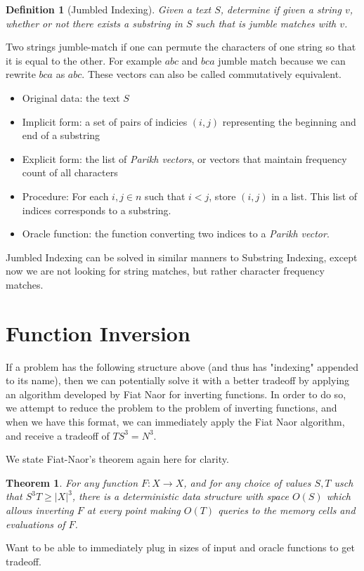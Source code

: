 \documentclass{article}
\newtheorem{definition}{Definition}
\newtheorem{theorem}{Theorem}
\begin{document}
\begin{definition}[Jumbled Indexing]
Given a text $S$, determine if given a string $v$, whether or not there exists a substring in $S$ such that is jumble matches with $v$.
\end{definition}
Two strings jumble-match if one can permute the characters of one string so that it is equal to the other. For example $abc$ and $bca$ jumble match because we can rewrite $bca$ as $abc$. These vectors can also be called commutatively equivalent.
\begin{itemize}
    \item Original data: the text $S$
    \item Implicit form: a set of pairs of indicies $(i,j)$ representing the beginning and end of a substring
    \item Explicit form: the list of \textit{Parikh vectors}, or vectors that maintain frequency count of all characters
    \item Procedure: For each $i,j \in n$ such that $i<j$, store $(i,j)$ in a list. This list of indices corresponds to a substring.
    \item Oracle function: the function converting two indices to a \textit{Parikh vector}.
\end{itemize}
Jumbled Indexing can be solved in similar manners to Substring Indexing, except now we are not looking for string matches, but rather character frequency matches.

\section{Function Inversion}
\label{sec:solution}
If a problem has the following structure above (and thus has "indexing" appended to its name), then we can potentially solve it with a better tradeoff by applying an algorithm developed by Fiat Naor for inverting functions. In order to do so, we attempt to reduce the problem to the problem of inverting functions, and when we have this format, we can immediately apply the Fiat Naor algorithm, and receive a tradeoff of $TS^3 = N^3$.

We state Fiat-Naor's theorem again here for clarity.
\begin{theorem}
For any function $F:X \rightarrow X$, and for any choice of values $S,T$ usch that $S^3T \geq |X|^3$, there is a deterministic data structure with space $O(S)$ which allows inverting $F$ at every point making $O(T)$ queries to the memory cells and evaluations of $F$.
\end{theorem}

Want to be able to immediately plug in sizes of input and oracle functions to get tradeoff.
\end{document}
